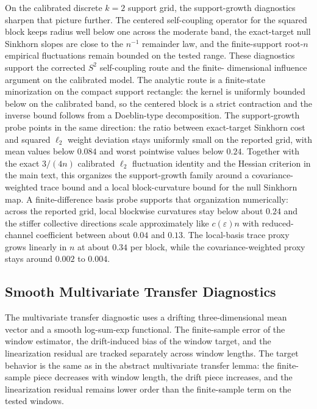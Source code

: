 



On the calibrated discrete $k=2$ support grid, the support-growth diagnostics sharpen
that picture further. The centered self-coupling operator for the squared block
keeps radius well below one across the moderate band, the exact-target null
Sinkhorn slopes are close to the $n^{-1}$ remainder law, and the finite-support
root-$n$ empirical fluctuations remain bounded on the tested range. These
diagnostics support the corrected $S^2$ self-coupling route and the finite-
dimensional influence argument on the calibrated model. The analytic route is a
finite-state minorization on the compact support rectangle: the kernel is
uniformly bounded below on the calibrated band, so the centered block is a
strict contraction and the inverse bound follows from a Doeblin-type
decomposition. The support-growth probe points in the same direction: the ratio
between exact-target Sinkhorn cost and squared $\ell_2$ weight deviation stays
uniformly small on the reported grid, with mean values below $0.084$ and worst
pointwise values below $0.24$. Together with the exact $3/(4n)$ calibrated
$\ell_2$ fluctuation identity and the Hessian criterion in the main text, this
organizes the support-growth family around a covariance-weighted trace bound
and a local block-curvature bound for the null Sinkhorn map. A finite-difference
basis probe supports that organization numerically:
across the reported grid, local blockwise curvatures stay below about $0.24$ and
the stiffer collective directions scale approximately like $c(\varepsilon)n$
with reduced-channel coefficient between about $0.04$ and $0.13$. The
local-basis trace proxy grows linearly in $n$ at about $0.34$ per block, while
the covariance-weighted proxy stays around $0.002$ to $0.004$.



\subsection{Smooth Multivariate Transfer Diagnostics}

The multivariate transfer diagnostic uses a drifting three-dimensional mean vector and
a smooth log-sum-exp functional. The finite-sample error of the window estimator,
the drift-induced bias of the window target, and the linearization residual are
tracked separately across window lengths. The target behavior is the same as in
the abstract multivariate transfer lemma: the finite-sample piece decreases with
window length, the drift piece increases, and the linearization residual remains
lower order than the finite-sample term on the tested windows.

